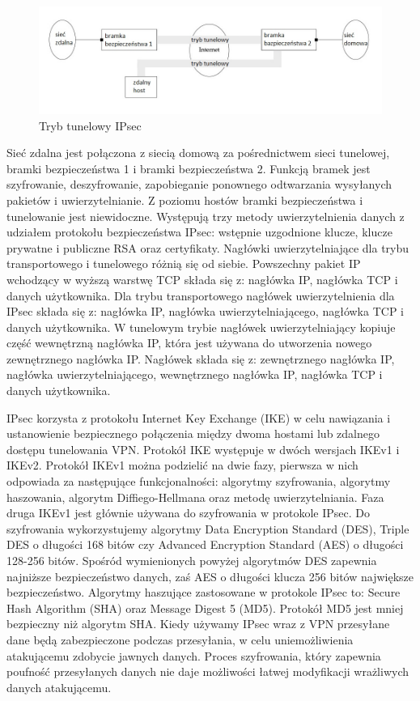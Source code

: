 \documentclass[12p]{article}
\begin{document}
\begin{figure}[H]
\centering
\includegraphics[width=15cm]{tryb_tunelowy_IPsec.jpg}
\caption{Tryb tunelowy IPsec}\label{IPsec}
\end{figure}
 
\quad Sieć zdalna jest połączona z siecią domową za pośrednictwem sieci tunelowej, bramki bezpieczeństwa 1 i bramki bezpieczeństwa 2. Funkcją bramek jest szyfrowanie, deszyfrowanie, zapobieganie ponownego odtwarzania wysyłanych pakietów i uwierzytelnianie. Z poziomu hostów bramki bezpieczeństwa i tunelowanie jest niewidoczne. Występują trzy metody uwierzytelnienia danych z udziałem protokołu bezpieczeństwa IPsec: wstępnie uzgodnione klucze, klucze prywatne i publiczne RSA oraz certyfikaty. Nagłówki uwierzytelniające dla trybu transportowego i tunelowego różnią się od siebie. Powszechny pakiet IP wchodzący w wyższą warstwę TCP składa się z: nagłówka IP, nagłówka TCP i danych użytkownika. Dla trybu transportowego nagłówek uwierzytelnienia dla IPsec składa się z: nagłówka IP, nagłówka uwierzytelniającego, nagłówka TCP i danych użytkownika. W tunelowym trybie nagłówek uwierzytelniający kopiuje część wewnętrzną nagłówka IP, która jest używana do utworzenia nowego zewnętrznego nagłówka IP. Nagłówek składa się z: zewnętrznego nagłówka IP, nagłówka uwierzytelniającego, wewnętrznego nagłówka IP, nagłówka TCP i danych użytkownika.

IPsec korzysta z protokołu Internet Key Exchange (IKE) w celu nawiązania i ustanowienie bezpiecznego połączenia między dwoma hostami lub zdalnego dostępu tunelowania VPN. Protokół IKE występuje w dwóch wersjach IKEv1 i IKEv2. Protokół IKEv1 można podzielić na dwie fazy, pierwsza w nich odpowiada za następujące funkcjonalności: algorytmy szyfrowania, algorytmy haszowania, algorytm Diffiego-Hellmana oraz metodę uwierzytelniania. Faza druga IKEv1 jest głównie używana do szyfrowania w protokole IPsec. Do szyfrowania wykorzystujemy algorytmy Data Encryption Standard (DES),  Triple DES o długości 168 bitów czy Advanced Encryption Standard (AES) o długości 128-256 bitów. Spośród wymienionych powyżej algorytmów DES zapewnia najniższe bezpieczeństwo danych, zaś AES o długości klucza 256 bitów największe bezpieczeństwo. Algorytmy haszujące zastosowane w protokole IPsec to: Secure Hash Algorithm (SHA) oraz Message Digest 5 (MD5). Protokół MD5 jest mniej bezpieczny niż algorytm SHA.
Kiedy używamy IPsec wraz z VPN przesyłane dane będą zabezpieczone podczas przesyłania, w celu uniemożliwienia atakującemu zdobycie jawnych danych. Proces szyfrowania, który zapewnia poufność przesyłanych danych nie daje możliwości łatwej modyfikacji wrażliwych danych atakującemu.
\end{document}
